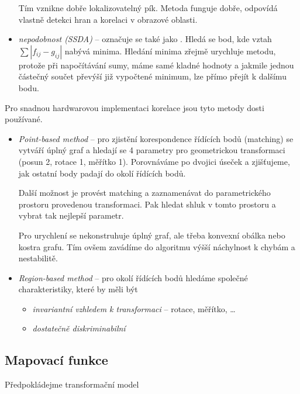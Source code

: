 \begin{itemize}
Tím vznikne dobře lokalizovatelný pík. Metoda funguje dobře, odpovídá vlastně detekci hran a korelaci v obrazové oblasti.

\item {\em nepodobnost (SSDA)} -- označuje se také jako . Hledá se bod,
 kde vztah $\sum|f_{ij}-g_{ij}|$
nabývá minima. Hledání minima zřejmě urychluje metodu, protože při napočítávání sumy, máme samé kladné hodnoty a 
jakmile jednou částečný součet převýší již vypočtené minimum, lze přímo přejít k dalšímu bodu.
\end{itemize}

Pro snadnou hardwarovou implementaci korelace jsou tyto metody dosti používané.


\begin{itemize}
\item {\em Point-based method} -- pro zjistění korespondence řídících bodů (matching) se vytváří úplný graf a hledají se 
4 parametry pro geometrickou transformaci (posun 2, rotace 1, měřítko 1). Porovnáváme po dvojici úseček a zjišťujeme,
jak ostatní body padají do okolí řídících bodů.

Další možnost je provést matching a zaznamenávat do parametrického prostoru provedenou transformaci. Pak hledat shluk
v tomto prostoru a vybrat tak nejlepší parametr.

Pro urychlení se nekonstruhuje úplný graf, ale třeba konvexní obálka nebo kostra grafu. Tím ovšem zavádíme do algoritmu výšší 
náchylnost k chybám a nestabilitě.


\item {\em Region-based method} -- pro okolí řídících bodů hledáme společné charakteristiky, které by měli být
 \begin{itemize}
  \item {\em invariantní vzhledem k transformaci} -- rotace, měřítko, \dots
  \item {\em dostatečně diskriminabilní} 
 \end{itemize}
\end{itemize}

\subsection{Mapovací funkce}
Předpokládejme transformační model

